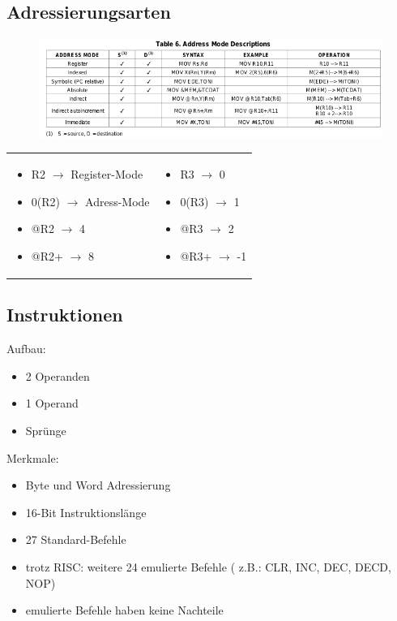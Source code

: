 \documentclass{beamer}
\begin{document}
\subsection{Adressierungsarten}
\begin{frame}
\begin{figure}[t]
\includegraphics[scale=0.7,center]{MSP430_instruktion_mode_dia.jpg}
\end{figure}
\begin{tabular}{p{}|p{}}
\begin{itemize}
\item R2 $\rightarrow$ Register-Mode
\item 0(R2) $\rightarrow$ Adress-Mode 
\item @R2 $\rightarrow$ 4
\item @R2+ $\rightarrow$ 8
\end{itemize}
&
\begin{itemize}
\item    R3 $\rightarrow$ 0
\item 0(R3) $\rightarrow$ 1
\item @R3 $\rightarrow$ 2
\item @R3+ $\rightarrow$ -1
\end{itemize}
\end{tabular}
\end{frame}
\subsection{Instruktionen}
\begin{frame}
Aufbau:
\begin{itemize}
\item 2 Operanden
\item 1 Operand
\item Sprünge
\end{itemize}
Merkmale:
\begin{itemize}
\item Byte und Word Adressierung
\item 16-Bit Instruktionslänge
\item 27 Standard-Befehle
\item trotz RISC: weitere 24 emulierte Befehle ( z.B.: CLR, INC, DEC, DECD, NOP) 
\item emulierte Befehle haben keine Nachteile
\end{itemize}
\end{frame}
\end{document}
